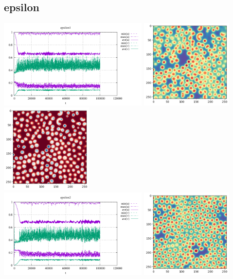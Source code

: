 \subsection*{epsilon}
\begin{center}
\includegraphics[height=4.5cm]{python_codes/fieldstone_171/results/epsilon1_stats}
\includegraphics[height=4.5cm]{python_codes/fieldstone_171/results/epsilon1_solution_final_u.png}
\includegraphics[height=4.5cm]{python_codes/fieldstone_171/results/epsilon1_solution_final_v.png}\\
\includegraphics[height=4.5cm]{python_codes/fieldstone_171/results/epsilon2_stats}
\includegraphics[height=4.5cm]{python_codes/fieldstone_171/results/epsilon2_solution_final_u.png}

\end{center}
